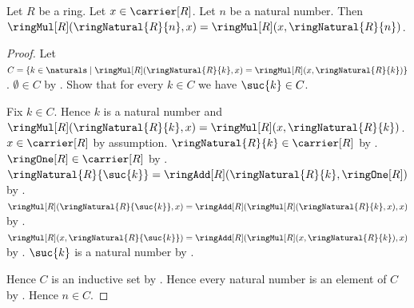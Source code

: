 \begin{theorem}\label{ring_natural_central}
    Let $R$ be a ring.
    Let $x\in\carrier[R]$.
    Let $n$ be a natural number.
    Then $\ringMul[R](\ringNatural{R}{n},x)
        =\ringMul[R](x,\ringNatural{R}{n})$.
\end{theorem}
\begin{proof}
    Let $C=\{k\in\naturals\mid
        \ringMul[R](\ringNatural{R}{k},x)
            =\ringMul[R](x,\ringNatural{R}{k})\}$.
    $\emptyset\in C$ by
        .
    Show that for every $k\in C$ we have $\suc{k}\in C$.
    \begin{subproof}
        Fix $k\in C$.
        Hence $k$ is a natural number and
            $\ringMul[R](\ringNatural{R}{k},x)
                =\ringMul[R](x,\ringNatural{R}{k})$.
        $x\in\carrier[R]$ by assumption.
        $\ringNatural{R}{k}\in\carrier[R]$ by
            .
        $\ringOne[R]\in\carrier[R]$ by .
        $\ringNatural{R}{\suc{k}}=
            \ringAdd[R](\ringNatural{R}{k},\ringOne[R])$ by
            .
        $\ringMul[R](\ringNatural{R}{\suc{k}},x)=
            \ringAdd[R](
                \ringMul[R](\ringNatural{R}{k},x),x)$ by
            .
        $\ringMul[R](x,\ringNatural{R}{\suc{k}})=
            \ringAdd[R](
                \ringMul[R](x,\ringNatural{R}{k}),x)$ by
            .
        $\suc{k}$ is a natural number by .
    \end{subproof}
    Hence $C$ is an inductive set by .
    Hence every natural number is an element of $C$ by
        .
    Hence $n\in C$.
\end{proof}

